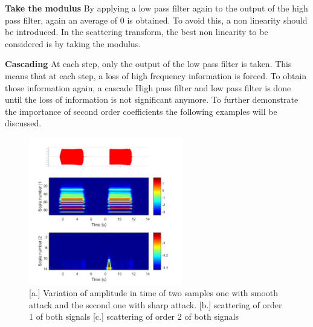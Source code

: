 \documentclass[hidelinks,12pt]{report}
\begin{document}
\textbf{Take the modulus}
By applying a low pass filter again to the output of the high pass filter, again an average of 0 is obtained. To avoid this, a non linearity should be introduced. In the scattering transform, the best non linearity to be considered is by taking the modulus.\par
\textbf{Cascading}
At each step, only the output of the low pass filter is taken. This means that at each step, a loss of high frequency information is forced. To obtain those information again, a cascade High pass filter and low pass filter is done until the loss of information is not significant anymore. To further demonstrate the importance of second order coefficients the following examples will be discussed.\par
\begin{figure}[t!]
  
  \centering
	    \includegraphics[width=0.6\textwidth]{att}
    \caption{[a.] Variation of amplitude in time of two samples one with smooth attack and the second one with sharp attack. [b.] scattering of order 1 of both signals [c.] scattering of order 2 of both signals }
    \label{attack}
\end{figure}
\end{document}
